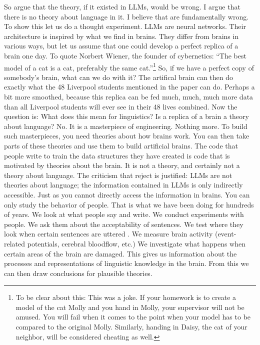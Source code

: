 So \citet{FoxKatzir2024a} argue that the theory, if it existed in LLMs, would be wrong. I argue that
there is no theory about language in it. I believe that \citet{AmbridgeBlything2024a} are
fundamentally wrong. To show this let us do a thought experiment. LLMs are neural networks. Their
architecture is inspired by what we find in brains. They differ from brains in various ways, but let
us assume that one could develop a perfect replica of a brain one day. To quote
Norbert Wiener, the founder of cybernetics: ``The best model of a cat is a cat, preferably the same
cat.''\footnote{%
To be clear about this: This was a joke. If your homework is to create a model of the cat Molly and
you hand in Molly, your supervisor will not be amused. You will fail when it comes to the point when
your model has to be compared to the original Molly. Similarly, handing in Daisy, the cat of your
neighbor, will be considered cheating as well.
} So, if we have a perfect copy of somebody's brain, what can we do with it? The artifical brain can then do exactly what
the 48 Liverpool students mentioned in the  paper can do. Perhaps a
bit more smoothed, because this replica can be fed much, much, much more data than all Liverpool
students will ever see in their 48 lives combined. Now the question is: What does this mean for
linguistics? Is a replica of a brain a theory about language? No. It is a masterpiece of
engineering. Nothing more. To build such masterpieces, you need theories about how brains work. You can then take parts of these theories and use them to build
artificial brains. The code that people write to train the data structures they have created is code
that is motivated by theories about the brain. It is not a theory, and certainly not a theory about
language. The criticism that  reject is justified: LLMs are not
theories about language; the information contained in LLMs is only indirectly accessible. Just as
you cannot directly access the information in brains. You can only study the behavior of
people. That is what we have been doing for hundreds of years. We look at what people say and write. We
conduct experiments with people. We ask them about the acceptability of sentences. We test where
they look when certain sentences are uttered \citep{TSKES96a}. We measure brain activity (event-related potentials,
cerebral bloodflow, etc.) We investigate what happens when certain areas of the brain are damaged.
This gives us information about the processes and representations of linguistic knowledge in the
brain. From this we can then draw conclusions for plausible theories.  

